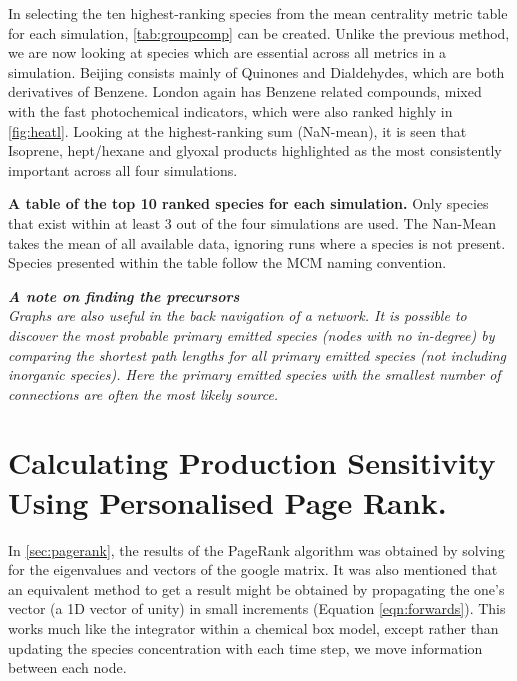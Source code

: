 In selecting the ten highest-ranking species from the mean centrality metric table for each simulation, \autoref{tab:groupcomp} can be created. Unlike the previous method, we are now looking at species which are essential across all metrics in a simulation.
Beijing consists mainly of Quinones and Dialdehydes, which are both derivatives of Benzene. London again has Benzene related compounds, mixed with the fast photochemical indicators, which were also ranked highly in \autoref{fig:heatl}. Looking at the highest-ranking sum (NaN-mean), it is seen that Isoprene, hept/hexane and glyoxal products highlighted as the most consistently important across all four simulations.

\begin{table}[H]
\centering
\small

\caption{\textbf{A table of the top 10 ranked species for each simulation.} Only species that exist within at least 3 out of the four simulations are used. The Nan-Mean takes the mean of all available data, ignoring runs where a species is not present. Species presented within the table follow the MCM naming convention.}
\label{tab:groupcomp}
\end{table}



\textit{\textbf{A note on finding the precursors}\\ Graphs are also useful in the back navigation of a network. It is possible to discover the most probable primary emitted species (nodes with no in-degree) by comparing the shortest path lengths for all primary emitted species (not including inorganic species). Here the primary emitted species with the smallest number of connections are often the most likely source.}




\section{Calculating Production Sensitivity Using Personalised Page Rank.}

In \autoref{sec:pagerank}, the results of the PageRank algorithm was obtained by solving for the eigenvalues and vectors of the google matrix. It was also mentioned that an equivalent method to get a result might be obtained by propagating the one's vector (a 1D vector of unity) in small increments (Equation \autoref{eqn:forwards}). This works much like the integrator within a chemical box model, except rather than updating the species concentration with each time step, we move information between each node.

